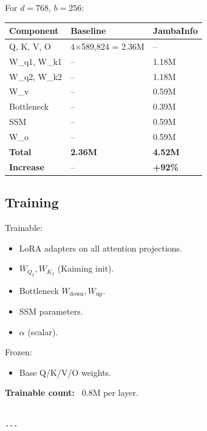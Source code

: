 For $d = 768$, $b = 256$:

\begin{table}[H]
\centering
\small
\begin{tabular}{lll}
\toprule
\textbf{Component} & \textbf{Baseline} & \textbf{JambaInfo} \\
\midrule
Q, K, V, O & 4$\times$589,824 = 2.36M & -- \\
W\_q1, W\_k1 & -- & 1.18M \\
W\_q2, W\_k2 & -- & 1.18M \\
W\_v & -- & 0.59M \\
Bottleneck & -- & 0.39M \\
SSM & -- & 0.59M \\
W\_o & -- & 0.59M \\
\textbf{Total} & \textbf{2.36M} & \textbf{4.52M} \\
\textbf{Increase} & -- & \textbf{+92\%} \\
\bottomrule
\end{tabular}
\end{table}

\subsection{Training}

Trainable:
\begin{itemize}
\item LoRA adapters on all attention projections.
\item $W_{Q_2}, W_{K_2}$ (Kaiming init).
\item Bottleneck $W_\text{down}, W_\text{up}$.
\item SSM parameters.
\item $\alpha$ (scalar).

\end{itemize}
Frozen:
\begin{itemize}
\item Base Q/K/V/O weights.

\end{itemize}
\textbf{Trainable count:} ~0.8M per layer.
\begin{lstlisting}

---
\end{lstlisting}